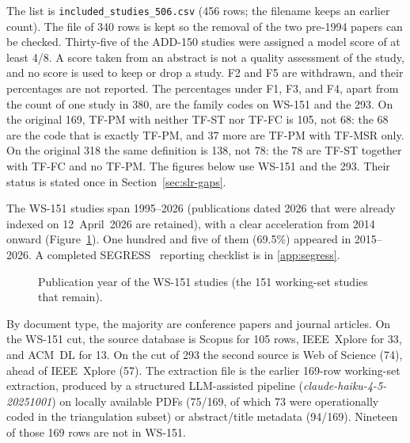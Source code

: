 The list is \texttt{included\_studies\_506.csv} (456 rows; the filename
keeps an earlier count). The file of 340 rows is kept so the removal of
the two pre-1994 papers can be checked. Thirty-five of the ADD-150
studies were assigned a model score of at least 4/8. A score taken from an
abstract is not a quality assessment of the study, and no score is used to
keep or drop a study. F2 and F5 are withdrawn, and their percentages are
not reported. The percentages under F1, F3, and F4, apart from the count
of one study in 380, are the family codes on WS-151 and the 293. On the
original 169, TF-PM with neither TF-ST nor TF-FC is 105, not 68: the 68
are the code that is exactly TF-PM, and 37 more are TF-PM with TF-MSR
only. On the original 318 the same definition is 138, not 78: the 78 are
TF-ST together with TF-FC and no TF-PM. The figures below use WS-151 and
the 293. Their status is stated once in Section~\ref{sec:slr-gaps}.

The WS-151 studies span 1995--2026 (publications dated 2026
that were already indexed on 12~April~2026 are retained), with a clear
acceleration from 2014 onward (Figure~\ref{fig:year-dist}). One hundred
and five of them (69.5\%) appeared in 2015--2026.
A completed SEGRESS~\cite{kitchenham2023segress} reporting checklist is in
\ref{app:segress}.

\begin{figure}[htbp]
\centering
{}
\caption{Publication year of the WS-151 studies (the 151 working-set
studies that remain).}
\label{fig:year-dist}
\end{figure}

By document type, the majority are conference papers and journal articles.
On the WS-151 cut, the source database is Scopus for 105 rows, IEEE~Xplore
for 33, and ACM~DL for 13. On the cut of 293 the second source is Web of
Science (74), ahead of IEEE~Xplore (57). The extraction file is the earlier
169-row working-set extraction, produced by a structured LLM-assisted
pipeline (\textit{claude-haiku-4-5-20251001}) on locally available PDFs
(75/169, of which 73 were operationally coded in the triangulation subset)
or abstract/title metadata (94/169). Nineteen of those 169 rows are not in
WS-151.

